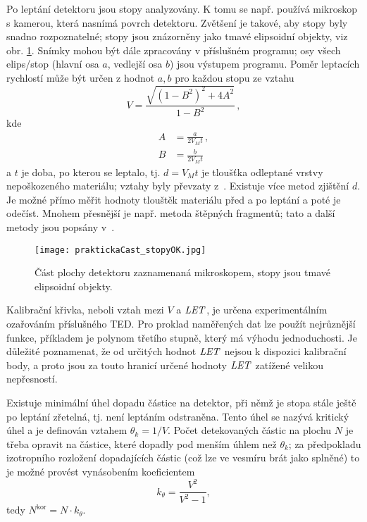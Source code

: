 Po leptání detektoru jsou stopy analyzovány. K tomu se např. používá mikroskop s kamerou, která nasnímá povrch detektoru. Zvětšení je takové, aby stopy byly snadno rozpoznatelné; stopy jsou znázorněny jako tmavé elipsoidní objekty, viz obr. \ref{fig:detektory_stopy}. Snímky mohou být dále zpracovány v příslušném programu; osy všech elips/stop (hlavní osa $a$, vedlejší osa $b$) jsou výstupem programu. 
Poměr leptacích rychlostí může být určen z hodnot $a,b$ pro každou stopu ze vztahu
\begin{equation}
  V=\frac{\sqrt{\left( 1-B^2 \right)^2+4A^2}}{1-B^2}\,,
  \label{eq:pomerLepRychlosti}
\end{equation}
kde
\begin{align*}
  A&=\frac{a}{2V_Mt}\,,\\
  B&=\frac{b}{2V_Mt}
\end{align*}
a $t$ je doba, po kterou se leptalo, tj. $d=V_Mt$ je tloušťka odleptané vrstvy nepoškozeného materiálu; vztahy byly převzaty z~\cite{ssntd}. Existuje více metod zjištění $d$. Je možné přímo měřit hodnoty tlouštěk materiálu před a po leptání a poté je odečíst. Mnohem přesnější je např. metoda štěpných fragmentů; tato a další metody jsou popsány v~\cite{thesisKPBrabcova}.    
\begin{figure}[ht]
  \centering
  \texttt{[image: praktickaCast\_stopyOK.jpg]}
  \caption{Část plochy detektoru zaznamenaná mikroskopem, stopy jsou tmavé elipsoidní objekty.}
  \label{fig:detektory_stopy}
\end{figure}

Kalibrační křivka, neboli vztah mezi $V$ a $\mathit{LET}$, je určena experimentálním ozařováním příslušného TED. Pro proklad naměřených dat lze použít nejrůznější funkce, příkladem je polynom třetího stupně, který má výhodu jednoduchosti. Je důležité poznamenat, že od určitých hodnot $\mathit{LET}$ nejsou k dispozici kalibrační body, a proto jsou za touto hranicí určené hodnoty $\mathit{LET}$ zatížené velikou nepřesností.

Existuje minimální úhel dopadu částice na detektor, při němž je stopa stále ještě po leptání zřetelná, tj. není leptáním odstraněna. Tento úhel se nazývá kritický úhel a je definován vztahem $\theta_k=1/V$. Počet detekovaných částic na plochu $N$ je třeba opravit na částice, které dopadly pod menším úhlem než $\theta_k$; za předpokladu izotropního rozložení dopadajících částic (což lze ve vesmíru brát jako splněné) to je možné provést vynásobením koeficientem 
\begin{equation}
  k_{\theta}=\frac{V^2}{V^2-1},
  \label{eq:kritickyUhel}
\end{equation}
tedy $N^{\text{kor}}=N\cdot k_{\theta}$. 

